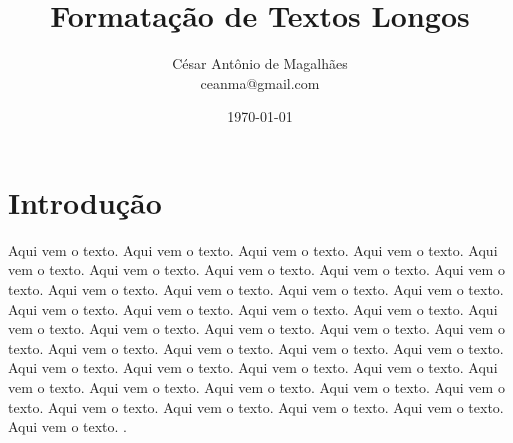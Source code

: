 \documentclass[12pt,a4paper]{article}
\title{Formatação de Textos Longos}
\author{César Antônio de Magalhães \\ ceanma@gmail.com}
\date{\today}
\begin{document}
	\maketitle
	
	\tableofcontents	
	\newpage
	
	\listoffigures
	\newpage
	
	\listoftables
	\newpage
	
	\section{Introdução}
	
	Aqui vem o texto. Aqui vem o texto. Aqui vem o texto. Aqui vem o texto. Aqui vem o texto. Aqui vem o texto. Aqui vem o texto. Aqui vem o texto. Aqui vem o texto. Aqui vem o texto. Aqui vem o texto. Aqui vem o texto. Aqui vem o texto. Aqui vem o texto. Aqui vem o texto. Aqui vem o texto. Aqui vem o texto. Aqui vem o texto. Aqui vem o texto. Aqui vem o texto. Aqui vem o texto. Aqui vem o texto. Aqui vem o texto. Aqui vem o texto. Aqui vem o texto. Aqui vem o texto. Aqui vem o texto. Aqui vem o texto. Aqui vem o texto. Aqui vem o texto. Aqui vem o texto. Aqui vem o texto. Aqui vem o texto. Aqui vem o texto. Aqui vem o texto. Aqui vem o texto. Aqui vem o texto. Aqui vem o texto. Aqui vem o texto. Aqui vem o texto. \cite{meuartigo}.
	
\end{document}
